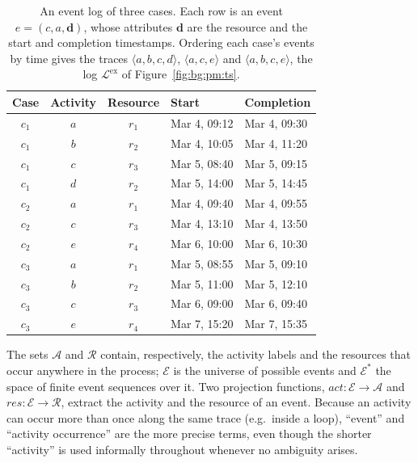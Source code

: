     \begin{table}[t]
      \centering
      \small
      \begin{tabular}{cccll}
        \toprule
        Case & Activity & Resource & Start & Completion \\
        \midrule
        $c_1$ & $a$ & $r_1$ & Mar 4, 09:12 & Mar 4, 09:30 \\
        $c_1$ & $b$ & $r_2$ & Mar 4, 10:05 & Mar 4, 11:20 \\
        $c_1$ & $c$ & $r_3$ & Mar 5, 08:40 & Mar 5, 09:15 \\
        $c_1$ & $d$ & $r_2$ & Mar 5, 14:00 & Mar 5, 14:45 \\
        \midrule
        $c_2$ & $a$ & $r_1$ & Mar 4, 09:40 & Mar 4, 09:55 \\
        $c_2$ & $c$ & $r_3$ & Mar 4, 13:10 & Mar 4, 13:50 \\
        $c_2$ & $e$ & $r_4$ & Mar 6, 10:00 & Mar 6, 10:30 \\
        \midrule
        $c_3$ & $a$ & $r_1$ & Mar 5, 08:55 & Mar 5, 09:10 \\
        $c_3$ & $b$ & $r_2$ & Mar 5, 11:00 & Mar 5, 12:10 \\
        $c_3$ & $c$ & $r_3$ & Mar 6, 09:00 & Mar 6, 09:40 \\
        $c_3$ & $e$ & $r_4$ & Mar 7, 15:20 & Mar 7, 15:35 \\
        \bottomrule
      \end{tabular}
      \caption{An event log of three cases. Each row is an event
        $e = (c, a, \mathbf{d})$, whose attributes $\mathbf{d}$ are the
        resource and the start and completion timestamps. Ordering each case's
        events by time gives the traces $\langle a,b,c,d\rangle$,
        $\langle a,c,e\rangle$ and $\langle a,b,c,e\rangle$, the log
        $\mathcal{L}^{\mathrm{ex}}$ of Figure~\ref{fig:bg:pm:ts}.}
      \label{tab:bg:pm:log}
    \end{table}

    The sets $\mathcal{A}$ and $\mathcal{R}$ contain, respectively, the activity
    labels and the resources that occur anywhere in the process;
    $\mathcal{E}$ is the universe of possible events and $\mathcal{E}^{*}$ the
    space of finite event sequences over it. Two projection functions,
    $act : \mathcal{E} \to \mathcal{A}$ and $res : \mathcal{E} \to \mathcal{R}$,
    extract the activity and the resource of an event. Because an activity can
    occur more than once along the same trace (e.g.\ inside a loop), ``event''
    and ``activity occurrence'' are the more precise terms, even though the
    shorter ``activity'' is used informally throughout whenever no ambiguity
    arises.

